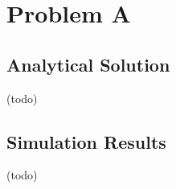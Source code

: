 \documentclass{article}
\begin{document}
\section{Problem A}
\subsection{Analytical Solution}
(todo)
\subsection{Simulation Results}
(todo)
\end{document}

